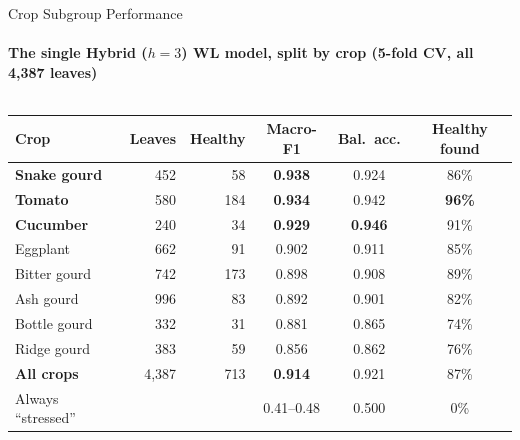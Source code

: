 \documentclass[aspectratio=169, 11pt]{beamer}
\begin{document}
\begin{frame}{Crop Subgroup Performance}
    \framesubtitle{The single Hybrid ($h = 3$) WL model, split by crop (5-fold CV, all 4,387 leaves)}

    \begin{columns}[T, onlytextwidth]
        \centering
        \scriptsize
        \setlength{\tabcolsep}{3.2pt}
        \renewcommand{\arraystretch}{1.22}
        \begin{tabular}{@{}l r r c c c@{}}
            \toprule
            \textbf{Crop} & \textbf{Leaves} & \textbf{Healthy} & \textbf{Macro-F1} & \textbf{Bal.\ acc.} & \textbf{Healthy found} \\
            \midrule
            \textbf{\textcolor{amritaMaroon}{Snake gourd}} & 452 & 58 & \textbf{\textcolor{amritaMaroon}{0.938}} & 0.924 & 86\% \\
            \textbf{Tomato} & 580 & 184 & \textbf{0.934} & 0.942 & \textbf{96\%} \\
            \textbf{Cucumber} & 240 & 34 & \textbf{0.929} & \textbf{0.946} & 91\% \\
            Eggplant & 662 & 91 & 0.902 & 0.911 & 85\% \\
            Bitter gourd & 742 & 173 & 0.898 & 0.908 & 89\% \\
            Ash gourd & 996 & 83 & 0.892 & 0.901 & 82\% \\
            Bottle gourd & 332 & 31 & 0.881 & 0.865 & 74\% \\
            Ridge gourd & 383 & 59 & 0.856 & 0.862 & 76\% \\
            \midrule
            \textbf{All crops} & 4,387 & 713 & \textbf{0.914} & 0.921 & 87\% \\
            {\tiny Always ``stressed''} & & & {\tiny 0.41--0.48} & {\tiny 0.500} & {\tiny 0\%} \\
            \bottomrule
        \end{tabular}



\end{columns}
\end{frame}
\end{document}

